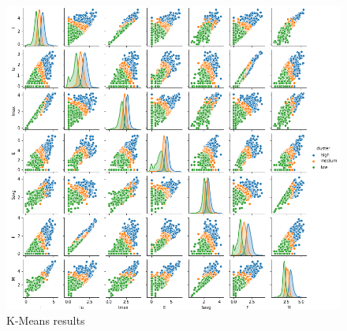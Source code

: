 \begin{figure}[h!]
	\captionsetup{justification=centering}
	\centering
	\includegraphics[width=\textwidth]{img/clustering/pair_plot_clust.png}
	\centering
	\caption{K-Means results}
	\label{fig:pairplot}
\end{figure}


